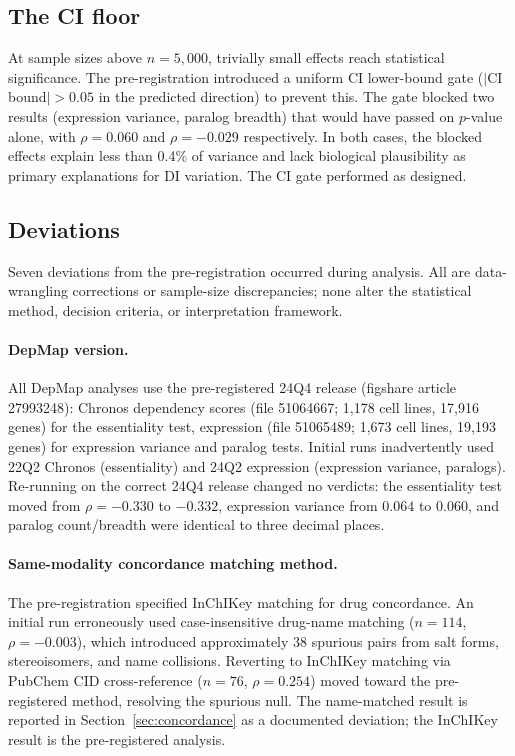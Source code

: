 \documentclass[11pt]{article}
\begin{document}
\subsection{The CI floor}

At sample sizes above $n = 5{,}000$, trivially small effects reach
statistical significance.  The pre-registration introduced a uniform
CI lower-bound gate ($|$CI bound$| > 0.05$ in the predicted direction)
to prevent this.  The gate blocked two results (expression variance, paralog breadth) that
would have passed on $p$-value alone, with $\rho = 0.060$ and
$\rho = -0.029$
respectively.  In both cases, the blocked effects explain less than
0.4\% of variance and lack biological plausibility as primary
explanations for DI variation.  The CI gate performed as designed.

\subsection{Deviations}

Seven deviations from the pre-registration occurred during analysis.
All are data-wrangling corrections or sample-size discrepancies; none
alter the statistical method, decision criteria, or interpretation
framework.

\paragraph{DepMap version.}
All DepMap analyses use the pre-registered 24Q4 release (figshare
article 27993248): Chronos dependency scores (file 51064667; 1{,}178
cell lines, 17{,}916 genes) for the essentiality test, expression
(file 51065489; 1{,}673 cell lines, 19{,}193 genes) for expression
variance and paralog tests.
Initial runs inadvertently used 22Q2 Chronos (essentiality) and 24Q2
expression (expression variance, paralogs).  Re-running on the correct 24Q4 release changed no
verdicts: the essentiality test moved from $\rho = -0.330$ to $-0.332$,
expression variance from $0.064$ to $0.060$, and paralog count/breadth
were identical to three decimal places.

\paragraph{Same-modality concordance matching method.}
The pre-registration specified InChIKey matching for drug concordance.
An initial run erroneously used case-insensitive drug-name matching
($n = 114$, $\rho = -0.003$), which introduced approximately 38
spurious pairs from salt forms, stereoisomers, and name collisions.
Reverting to InChIKey matching via PubChem CID cross-reference
($n = 76$, $\rho = 0.254$) moved toward the pre-registered method,
resolving the spurious null.  The name-matched result is reported in
Section~\ref{sec:concordance} as a documented deviation; the InChIKey
result is the pre-registered analysis.
\end{document}
